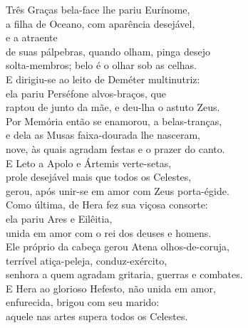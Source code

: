 \begin{pages}
\begin{Rightside}
\quad{}Três Graças bela-face lhe pariu Eurínome,\\
a filha de Oceano, com aparência desejável,\\
  e a atraente \\
de suas pálpebras, quando olham, pinga desejo \\
solta-membros; belo é o olhar sob as celhas.\\

\quad{}E dirigiu-se ao leito de Deméter multinutriz:\\
ela pariu Perséfone alvos-braços, que \\
raptou de junto da mãe, e deu-lha o astuto Zeus.\\

\quad{}Por Memória então se enamorou, a belas-tranças, \\
e dela as Musas faixa-dourada lhe nasceram,\\
nove, às quais agradam festas e o prazer do canto.\\

\quad{}E Leto a Apolo e Ártemis verte-setas,\\
prole desejável mais que todos os Celestes,\\
gerou, após unir-se em amor com Zeus porta-égide. \\

\quad{}Como última, de Hera fez sua viçosa consorte:\\
ela pariu  Ares e Eilêitia,\\
unida em amor com o rei dos deuses e homens.\\

\quad{}Ele próprio da cabeça gerou Atena olhos-de-coruja,\\
terrível atiça-peleja, conduz-exército, \\ 
senhora a quem agradam gritaria, guerras e combates.\\
E Hera ao glorioso Hefesto, não unida em amor,\\
 enfurecida, brigou com seu marido:\\
aquele nas artes supera todos os Celestes.\\


\end{Rightside}
\end{pages}
